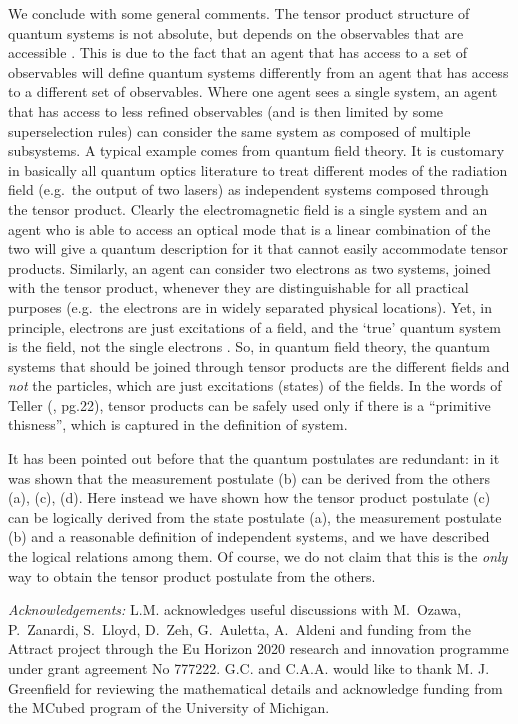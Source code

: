 \documentclass[aps,prl,amsmath,amssymb,twocolumn,nofootinbib]{revtex4}
\theoremstyle{plain}
\theoremstyle{definition}
\theoremstyle{remark}
\begin{document}
We conclude with some general comments. The tensor product structure
of quantum systems is not absolute, but depends on the observables
that are accessible \cite{zanardi,zanardilloyd}. This is due to the
fact that an agent that has access to a set of observables will define
quantum systems differently from an agent that has access to a
different set of observables. Where one agent sees a single system, an
agent that has access to less refined observables (and is then limited
by some superselection rules) can consider the same system as composed
of multiple subsystems. A typical example \cite{tellerbook} comes from
quantum field theory. It is customary in basically all quantum optics
literature to treat different modes of the radiation field (e.g.~the
output of two lasers) as independent systems composed through the
tensor product.  Clearly the electromagnetic field is a single system
and an agent who is able to access an optical mode that is a linear
combination of the two will give a quantum description for it that
cannot easily accommodate tensor products. Similarly, an agent can
consider two electrons as two systems, joined with the tensor product,
whenever they are distinguishable for all practical purposes (e.g.~the
electrons are in widely separated physical locations). Yet, in
principle, electrons are just excitations of a field, and the `true'
quantum system is the field, not the single electrons
\cite{teller,tellerbook}.  So, in quantum field theory, the quantum
systems that should be joined through tensor products are the
different fields and {\em not} the particles, which are just
excitations (states) of the fields. In the words of Teller
(\cite{tellerbook}, pg.22), tensor products can be safely used only if
there is a ``primitive thisness'', which is captured in the definition
of system.


It has been pointed out before that the quantum postulates are
redundant: in \cite{masanes,hartle} it was shown that the measurement
postulate (b) can be derived from the others (a), (c), (d). Here
instead we have shown how the tensor product postulate (c) can be
logically derived from the state postulate (a), the measurement
postulate (b) and a reasonable definition of independent systems, and
we have described the logical relations among them.  Of course, we do
not claim that this is the {\em only} way to obtain the tensor product
postulate from the others.

{\it Acknowledgements:} L.M. acknowledges useful discussions with
M.~Ozawa, P.~Zanardi, S.~Lloyd, D.~Zeh, G.~Auletta, A.~Aldeni and
funding from the Attract project through the Eu Horizon 2020 research
and innovation programme under grant agreement No 777222. G.C. and C.A.A. would like to thank M. J. Greenfield for reviewing the mathematical details and acknowledge funding from the MCubed program of the University
	of Michigan.
\end{document}
